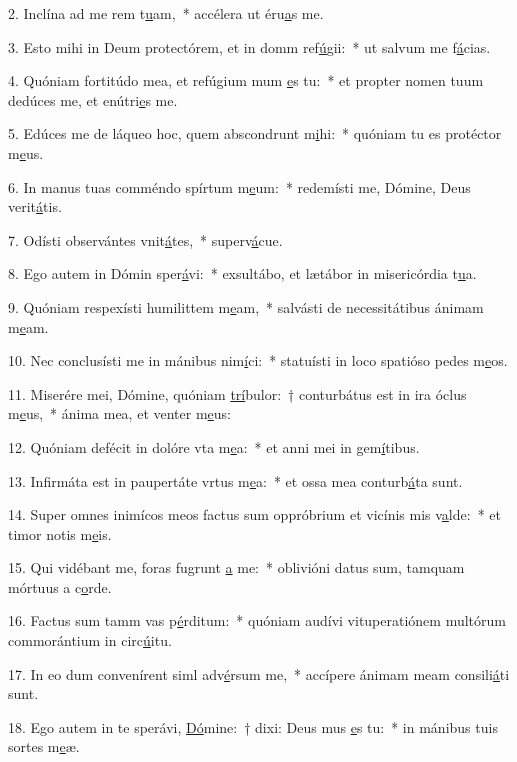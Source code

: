 2. Inclína ad me rem t\uline{u}am,~* accélera ut éru\uline{a}s me.\par 
3. Esto mihi in Deum protectórem, et in domm ref\uline{ú}gii:~* ut salvum me f\uline{á}cias.\par 
4. Quóniam fortitúdo mea, et refúgium mum \uline{e}s tu:~* et propter nomen tuum dedúces me, et enútri\uline{e}s me.\par 
5. Edúces me de láqueo hoc, quem abscondrunt m\uline{i}hi:~* quóniam tu es protéctor m\uline{e}us.\par 
6. In manus tuas comméndo spírtum m\uline{e}um:~* redemísti me, Dómine, Deus verit\uline{á}tis.\par 
7. Odísti observántes vnit\uline{á}tes,~* superv\uline{á}cue.\par 
8. Ego autem in Dómin sper\uline{á}vi:~* exsultábo, et lætábor in misericórdia t\uline{u}a.\par 
9. Quóniam respexísti humilittem m\uline{e}am,~* salvásti de necessitátibus ánimam m\uline{e}am.\par 
10. Nec conclusísti me in mánibus nim\uline{í}ci:~* statuísti in loco spatióso pedes m\uline{e}os.\par 
11. Miserére mei, Dómine, quóniam \uline{trí}bulor:~† conturbátus est in ira óclus m\uline{e}us,~* ánima mea, et venter m\uline{e}us:\par 
12. Quóniam defécit in dolóre vta m\uline{e}a:~* et anni mei in gem\uline{í}tibus.\par 
13. Infirmáta est in paupertáte vrtus m\uline{e}a:~* et ossa mea conturb\uline{á}ta sunt.\par 
14. Super omnes inimícos meos factus sum oppróbrium et vicínis mis v\uline{a}lde:~* et timor notis m\uline{e}is.\par 
15. Qui vidébant me, foras fugrunt \uline{a} me:~* oblivióni datus sum, tamquam mórtuus a c\uline{o}rde.\par 
16. Factus sum tamm vas p\uline{é}rditum:~* quóniam audívi vituperatiónem multórum commorántium in circ\uline{ú}itu.\par 
17. In eo dum convenírent siml adv\uline{é}rsum me,~* accípere ánimam meam consili\uline{á}ti sunt.\par 
18. Ego autem in te sperávi, \uline{Dó}mine:~† dixi: Deus mus \uline{e}s tu:~* in mánibus tuis sortes m\uline{e}æ.\par 
